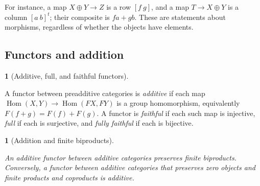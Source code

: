 \documentclass[11pt,a4paper]{article}
\newcommand{\mathheading}{}
\theoremstyle{plain}
\newtheorem*{plainstatement}{\mathheading}
\theoremstyle{definition}
\newtheorem*{definitionstatement}{\mathheading}
\newenvironment{mathstatement}[3]{\renewcommand{\mathheading}{#1 #2}\begin{plainstatement}[#3]}{\end{plainstatement}}
\newenvironment{mathdefinition}[3]{\renewcommand{\mathheading}{#1 #2}\begin{definitionstatement}[#3]}{\end{definitionstatement}}
\begin{document}
For instance, a map \(X\oplus Y\to Z\) is a row \([f\ g]\), and a map \(T\to X\oplus Y\) is a column \([a\ b]^t\); their composite is \(fa+gb\). These are statements about morphisms, regardless of whether the objects have elements.


\subsection{Functors and addition}

\begin{mathdefinition}{Definition}{3.8}{Additive, full, and faithful functors}
\label{env-3-8}

A functor between preadditive categories is \emph{additive} if each map \(\operatorname{Hom}(X,Y)\to\operatorname{Hom}(F X,F Y)\) is a group homomorphism, equivalently \(F(f+g)=F(f)+F(g)\). A functor is \emph{faithful} if each such map is injective, \emph{full} if each is surjective, and \emph{fully faithful} if each is bijective.


\par{}\par

\end{mathdefinition}
 
\begin{mathstatement}{Proposition}{3.9}{Addition and finite biproducts}
\label{env-3-9}

An additive functor between additive categories preserves finite biproducts. Conversely, a functor between additive categories that preserves zero objects and finite products and coproducts is additive.


\par{}\par

\end{mathstatement}
 
\end{document}
